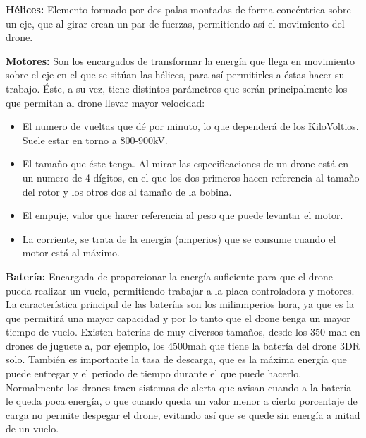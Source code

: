 \hspace{1 cm}\textbf{H\'elices:} Elemento formado por dos palas montadas de forma conc\'entrica sobre un eje, que al girar crean un par de fuerzas, permitiendo as\'i el movimiento del drone.

\hspace{1 cm}\textbf{Motores:} Son los encargados de transformar la energ\'ia que llega en movimiento sobre el eje en el que se sit\'uan las h\'elices, para as\'i permitirles a \'estas hacer su trabajo. \'Este, a su vez, tiene distintos par\'ametros que ser\'an principalmente los que permitan al drone llevar mayor velocidad: 

\begin{itemize}
\item El numero de vueltas que d\'e por minuto, lo que depender\'a de los KiloVoltios. Suele estar en torno a 800-900kV.

\item El tamaño que \'este tenga. Al mirar las especificaciones de un drone est\'a en un numero de 4 d\'igitos, en el que los dos primeros hacen referencia al tamaño del rotor y los otros dos al tamaño de la bobina. 

\item El empuje, valor que hacer referencia al peso que puede levantar el motor.

\item La corriente, se trata de la energ\'ia (amperios) que se consume cuando el motor est\'a al m\'aximo.
\end{itemize}

\hspace{1 cm}\textbf{Bater\'ia:} Encargada de proporcionar la energ\'ia suficiente para que el drone pueda realizar un vuelo, permitiendo trabajar a la placa controladora y motores. La caracter\'istica principal de las bater\'ias son los miliamperios hora, ya que es la que permitir\'a una mayor capacidad y por lo tanto que el drone tenga un mayor tiempo de vuelo. Existen bater\'ias de muy diversos tamaños, desde los 350 mah en drones de juguete a, por ejemplo, los 4500mah que tiene la bater\'ia del drone 3DR solo. Tambi\'en es importante la tasa de descarga, que es la m\'axima energ\'ia que puede entregar y el periodo de tiempo durante el que puede hacerlo. Normalmente los drones traen sistemas de alerta que avisan cuando a la bater\'ia le queda poca energ\'ia, o que cuando queda un valor menor a cierto porcentaje de carga no permite despegar el drone, evitando as\'i que se quede sin energ\'ia a mitad de un vuelo.

